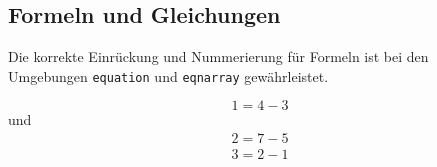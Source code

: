 \documentclass[english,utf8]{lni}
\begin{document}
\subsection{Formeln und Gleichungen}

Die korrekte Einrückung und Nummerierung für Formeln ist bei den Umgebungen \texttt{equation} und \texttt{eqnarray} gewährleistet.

\begin{equation}
  1=4-3
\end{equation}
und
\begin{eqnarray}
  2=7-5\\
  3=2-1
\end{eqnarray}

\printbibliography
\end{document}

